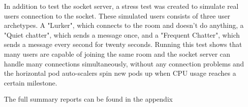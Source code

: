 In addition to test the socket server, a stress test was created to simulate real users connection to the socket. These simulated users consists of three user archetypes. A "Lurker", which connects to the room and doesn't do anything, a "Quiet chatter", which sends a message once, and a "Frequent Chatter", which sends a message every second for twenty seconds. Running this test shows that many users are capable of joining the same room and the socket server can handle many connections simultaneously, without any connection problems and the horizontal pod auto-scalers spin new pods up when CPU usage reaches a certain milestone.

The full summary reports can be found in the appendix